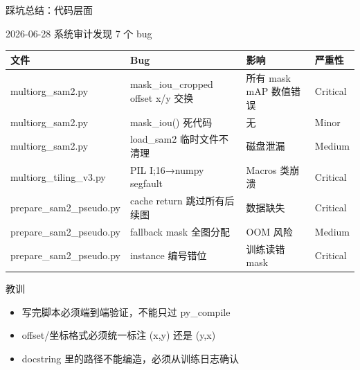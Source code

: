 \documentclass[aspectratio=169, 10pt]{beamer}
\begin{document}
\begin{frame}{踩坑总结：代码层面}
  \begin{block}{2026-06-28 系统审计发现 7 个 bug}
    \begin{tabular}{p{3.2cm}p{2.5cm}p{4.5cm}p{1.2cm}}
      \toprule
      \textbf{文件} & \textbf{Bug} & \textbf{影响} & \textbf{严重性} \\
      \midrule
      multiorg\_sam2.py & mask\_iou\_cropped offset x/y 交换 & 所有 mask mAP 数值错误 & \alert{Critical} \\
      multiorg\_sam2.py & mask\_iou() 死代码 & 无 & Minor \\
      multiorg\_sam2.py & load\_sam2 临时文件不清理 & 磁盘泄漏 & Medium \\
      multiorg\_tiling\_v3.py & PIL I;16→numpy segfault & Macros 类崩溃 & \alert{Critical} \\
      prepare\_sam2\_pseudo.py & cache return 跳过所有后续图 & 数据缺失 & \alert{Critical} \\
      prepare\_sam2\_pseudo.py & fallback mask 全图分配 & OOM 风险 & Medium \\
      prepare\_sam2\_pseudo.py & instance 编号错位 & 训练读错 mask & \alert{Critical} \\
      \bottomrule
    \end{tabular}
  \end{block}
  \vspace{0em}
  \begin{alertblock}{教训}
    \begin{itemize}
      \item 写完脚本必须端到端验证，不能只过 py\_compile
      \item offset/坐标格式必须统一标注 (x,y) 还是 (y,x)
      \item docstring 里的路径不能编造，必须从训练日志确认
    \end{itemize}
  \end{alertblock}
\end{frame}
\end{document}
